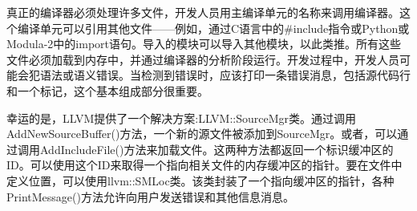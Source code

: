 真正的编译器必须处理许多文件，开发人员用主编译单元的名称来调用编译器。这个编译单元可以引用其他文件——例如，通过C语言中的\#include指令或Python或Modula-2中的import语句。导入的模块可以导入其他模块，以此类推。所有这些文件必须加载到内存中，并通过编译器的分析阶段运行。开发过程中，开发人员可能会犯语法或语义错误。当检测到错误时，应该打印一条错误消息，包括源代码行和一个标记，这个基本组成部分很重要。

幸运的是，LLVM提供了一个解决方案:LLVM::SourceMgr类。通过调用AddNewSourceBuffer()方法，一个新的源文件被添加到SourceMgr。或者，可以通过调用AddIncludeFile()方法来加载文件。这两种方法都返回一个标识缓冲区的ID。可以使用这个ID来取得一个指向相关文件的内存缓冲区的指针。要在文件中定义位置，可以使用llvm::SMLoc类。该类封装了一个指向缓冲区的指针，各种PrintMessage()方法允许向用户发送错误和其他信息消息。
